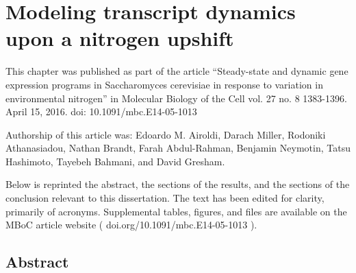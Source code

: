 \chapter{Modeling transcript dynamics upon a nitrogen upshift}

This
chapter was published as part of the article “Steady-state and dynamic
gene expression programs in Saccharomyces cerevisiae in response to
variation in environmental nitrogen” in Molecular Biology of the Cell
vol. 27 no. 8 1383-1396. April 15, 2016. doi: 10.1091/mbc.E14-05-1013 


Authorship of this article was: Edoardo M. Airoldi, Darach Miller,
Rodoniki Athanasiadou, Nathan Brandt, Farah Abdul-Rahman, Benjamin
Neymotin, Tatsu Hashimoto, Tayebeh Bahmani, and David Gresham. 


Below is reprinted the abstract, the sections of the results, and the
sections of the conclusion relevant to this dissertation. The text has
been edited for clarity, primarily of acronyms. Supplemental tables,
figures, and files are available on the MBoC article website (
doi.org/10.1091/mbc.E14-05-1013 ).  

\section{Abstract} 

